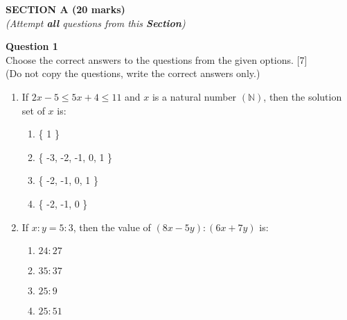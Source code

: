 \begin{center}
   \large
   \textbf{SECTION A (20 marks)}\\
   \vspace{5mm}
   \normalsize
   \textit{(Attempt \textbf{all} questions from this \textbf{Section})}
\end{center}
\par
\noindent
\textbf{Question 1}\\
Choose the correct answers to the questions from the given options. \hfill [7]\\
(Do not copy the questions, write the correct answers only.)
\par
\vspace{2mm}
\begin{enumerate}[label=(\roman*)]

    \item If $2x-5 \leq 5x + 4 \leq 11$ and $x$ is a natural number $(\mathbb{N})$, then
        the solution set of $x$ is:

        \begin{multicols}{2}
        \begin{enumerate}[label=(\alph*)]
            \item \{ 1 \} 
            \item \{ -3, -2, -1, 0, 1 \} 
            \item \{ -2, -1, 0, 1 \} 
            \item \{ -2, -1, 0 \} 
        \end{enumerate}
        \end{multicols}

    \item If $x:y = 5:3$, then the value of $(8x-5y):(6x+7y)$ is: 

        \begin{multicols}{2}
        \begin{enumerate}[label=(\alph*)]
            \item $24:27$
            \item $35:37$
            \item $25:9$
            \item $25:51$
        \end{enumerate}
        \end{multicols}


\end{enumerate}
